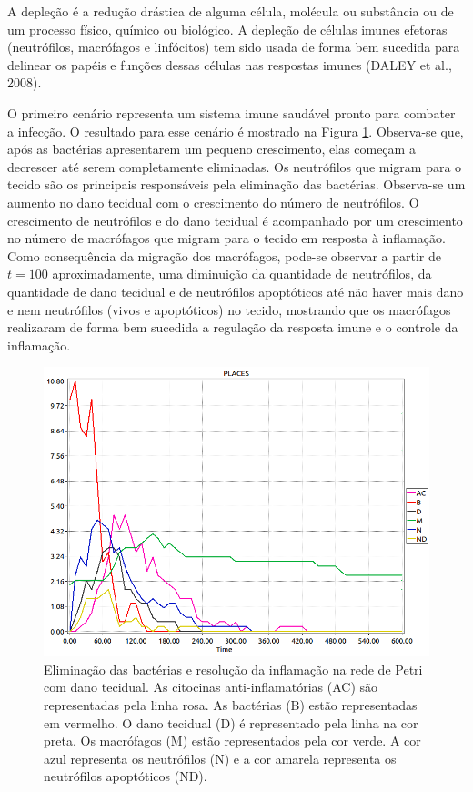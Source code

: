 \documentclass[a4paper,10pt]{article}
\begin{document}
		A depleção é a redução drástica de alguma célula, molécula ou substância ou de um processo físico, químico ou biológico. A depleção de células imunes efetoras (neutrófilos, 
		macrófagos e linfócitos) tem sido usada de forma bem sucedida para delinear os papéis e funções dessas células nas respostas imunes (DALEY et al., 2008).
		
		O primeiro cenário representa um sistema imune saudável pronto para combater a infecção. O resultado para esse cenário é mostrado na Figura \ref{cenario1}.
		Observa-se que, após as bactérias apresentarem um pequeno crescimento, elas começam a decrescer até serem completamente eliminadas. 
		Os neutrófilos que migram para o tecido são os principais responsáveis pela eliminação das bactérias. Observa-se um aumento no dano tecidual com o crescimento 
		do número de neutrófilos. O crescimento de neutrófilos e do dano tecidual é acompanhado por um crescimento no número de macrófagos que migram para o tecido em 
		resposta à inflamação. Como consequência da migração dos macrófagos, pode-se observar a partir de $t=100$ aproximadamente, uma diminuição da quantidade de neutrófilos, 
		da quantidade de dano tecidual e de neutrófilos apoptóticos até não haver mais dano e nem neutrófilos (vivos e apoptóticos) no tecido, 
		mostrando que os macrófagos realizaram de forma bem sucedida a regulação da resposta imune e o controle da inflamação. 	
		
		\begin{figure}
			\begin{center}
				\includegraphics[scale=0.45]{imagens/resultados/RedeB_N_M_D_AC_27-02_v3-BacteriaElimination-NormalResponsefig1_PLACES.png}
			\end{center}
			\caption{Eliminação das bactérias e resolução da inflamação na rede de Petri com dano tecidual. 
			As citocinas anti-inflamatórias (AC) são representadas pela linha rosa. As bactérias (B) estão representadas em vermelho. 
			O dano tecidual (D) é representado pela linha na cor preta. Os macrófagos (M) estão representados pela cor verde. 
			A cor azul representa os neutrófilos (N) e a cor amarela representa os neutrófilos apoptóticos (ND).  }
			\label{cenario1}
		\end{figure}
		
\end{document}
